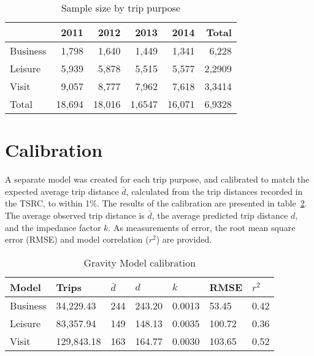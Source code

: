 \begin{table}[H]
\centering
\caption{Sample size by trip purpose}
\label{table:purpose-counts}
\begin{tabular}{lrrrrr}
\toprule
			& 2011 	& 2012 	& 2013 	& 2014 	& Total \\
\midrule
Business 	& 1,798  & 1,640  & 1,449  & 1,341  & 6,228 \\
Leisure 	& 5,939  & 5,878  & 5,515  & 5,577  & 2,2909 \\
Visit 		& 9,057  & 8,777  & 7,962  & 7,618  & 3,3414 \\ 
\midrule
Total 		& 18,694 & 18,016 & 1,6547 & 16,071 & 6,9328 \\ 
\bottomrule
\end{tabular}%

\end{table}

\section{Calibration}
A separate model was created for each trip purpose, and calibrated to match the expected average trip distance $\bar{d}$, calculated from the trip distances recorded in the TSRC, to within 1\%. The results of the calibration are presented in table~\ref{table:gravity-calibration}. The average observed trip distance is $\bar{d}$, the average predicted trip distance $d$, and the impedance factor $k$. As measurements of error, the root mean square error (RMSE) and model correlation ($r^2$) are provided.

\begin{table}[H]
\centering
\caption{Gravity Model calibration}
\label{table:gravity-calibration}
\begin{tabular}{@{}lllll|ll@{}}
\toprule
Model & Trips & $\bar{d}$ & $d$ & $k$ & RMSE & $r^2$ \\ \midrule
   Business  & 34,229.43  &     244     &  243.20   & 0.0013 & 53.45  & 0.42  \\
   Leisure   & 83,357.94  &     149     &  148.13   & 0.0035 & 100.72  & 0.36  \\
   Visit     & 129,843.18 &     163     &  164.77   & 0.0030 & 103.65 & 0.52  \\ \bottomrule
\end{tabular}
\end{table}

